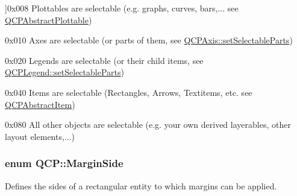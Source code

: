 \begin{Desc}
\begin{description}
{}]{\ttfamily 0x008} Plottables are selectable (e.\+g. graphs, curves, bars,... see \hyperlink{classQCPAbstractPlottable}{Q\+C\+P\+Abstract\+Plottable}) \item[{\em 
i\+Select\+Axes\hypertarget{namespaceQCP_a2ad6bb6281c7c2d593d4277b44c2b037ad6644ac55bef621645326e9dd7469caa}{}\label{namespaceQCP_a2ad6bb6281c7c2d593d4277b44c2b037ad6644ac55bef621645326e9dd7469caa}
}]{\ttfamily 0x010} Axes are selectable (or parts of them, see \hyperlink{classQCPAxis_a513f9b9e326c505d9bec54880031b085}{Q\+C\+P\+Axis\+::set\+Selectable\+Parts}) \item[{\em 
i\+Select\+Legend\hypertarget{namespaceQCP_a2ad6bb6281c7c2d593d4277b44c2b037a269c9af298e257d1108edec0432b5513}{}\label{namespaceQCP_a2ad6bb6281c7c2d593d4277b44c2b037a269c9af298e257d1108edec0432b5513}
}]{\ttfamily 0x020} Legends are selectable (or their child items, see \hyperlink{classQCPLegend_a9ce60aa8bbd89f62ae4fa83ac6c60110}{Q\+C\+P\+Legend\+::set\+Selectable\+Parts}) \item[{\em 
i\+Select\+Items\hypertarget{namespaceQCP_a2ad6bb6281c7c2d593d4277b44c2b037aea2f7c105d674e76d9b187b02ef29260}{}\label{namespaceQCP_a2ad6bb6281c7c2d593d4277b44c2b037aea2f7c105d674e76d9b187b02ef29260}
}]{\ttfamily 0x040} Items are selectable (Rectangles, Arrows, Textitems, etc. see \hyperlink{classQCPAbstractItem}{Q\+C\+P\+Abstract\+Item}) \item[{\em 
i\+Select\+Other\hypertarget{namespaceQCP_a2ad6bb6281c7c2d593d4277b44c2b037af67a50bc26147a13b551b3a625374949}{}\label{namespaceQCP_a2ad6bb6281c7c2d593d4277b44c2b037af67a50bc26147a13b551b3a625374949}
}]{\ttfamily 0x080} All other objects are selectable (e.\+g. your own derived layerables, other layout elements,...) \end{description}
\end{Desc}
\subsubsection[{\texorpdfstring{Margin\+Side}{MarginSide}}]{\setlength{\rightskip}{0pt plus 5cm}enum {\bf Q\+C\+P\+::\+Margin\+Side}}\hypertarget{namespaceQCP_a7e487e3e2ccb62ab7771065bab7cae54}{}\label{namespaceQCP_a7e487e3e2ccb62ab7771065bab7cae54}
Defines the sides of a rectangular entity to which margins can be applied.

